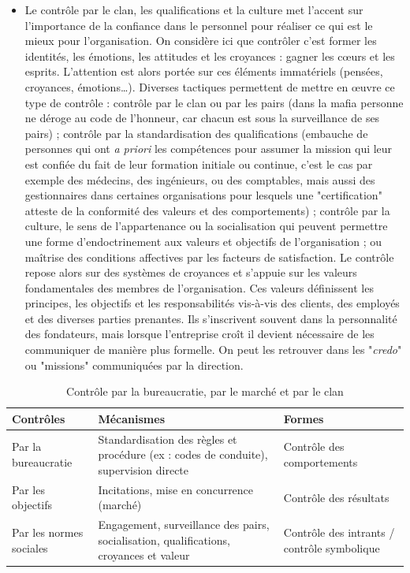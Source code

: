 \documentclass{tufte-handout}
\begin{document}
\begin{enumerate}
\begin{itemize}
\item Le contrôle par le clan, les qualifications et la culture met l'accent sur l'importance de la confiance dans le personnel pour réaliser ce qui est le mieux pour l'organisation. On considère ici que contrôler c'est former les identités, les émotions, les attitudes et les croyances : gagner les cœurs et les esprits. L'attention est alors portée sur ces éléments immatériels (pensées, croyances, émotions\ldots{}). Diverses tactiques permettent de mettre en œuvre ce type de contrôle : contrôle par le clan ou par les pairs (dans la mafia personne ne déroge au code de l'honneur, car chacun est sous la surveillance de ses pairs) ; contrôle par la standardisation des qualifications (embauche de personnes qui ont \emph{a priori} les compétences pour assumer la mission qui leur est confiée du fait de leur formation initiale ou continue, c'est le cas par exemple des médecins, des ingénieurs, ou des comptables, mais aussi des gestionnaires dans certaines organisations pour lesquels une "certification" atteste de la conformité des valeurs et des comportements) ; contrôle par la culture, le sens de l'appartenance ou la socialisation qui peuvent permettre une forme d'endoctrinement aux valeurs et objectifs de l'organisation ; ou maîtrise des conditions affectives par les facteurs de satisfaction. Le contrôle repose alors sur des systèmes de croyances et s'appuie sur les valeurs fondamentales des membres de l'organisation. Ces valeurs définissent les principes, les objectifs et les responsabilités vis-à-vis des clients, des employés et des diverses parties prenantes. Ils s'inscrivent souvent dans la personnalité des fondateurs, mais lorsque l'entreprise croît il devient nécessaire de les communiquer de manière plus formelle. On peut les retrouver dans les "\emph{credo}" ou "missions" communiquées par la direction.\\
\end{itemize}
\begin{table}[htbp]
\caption{Contrôle par la bureaucratie, par le marché et par le clan}
\centering
\begin{tabular}{lll}
Contrôles & Mécanismes & Formes\\
\hline
Par la bureaucratie & Standardisation des règles et procédure (ex : codes de conduite), supervision directe & Contrôle des comportements\\
Par les objectifs & Incitations, mise en concurrence (marché) & Contrôle des résultats\\
Par les normes sociales & Engagement, surveillance des pairs, socialisation, qualifications, croyances et valeur & Contrôle des intrants / contrôle symbolique\\
\end{tabular}
\end{table}


\end{enumerate}
\end{document}
